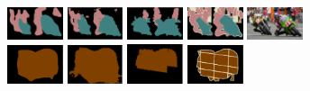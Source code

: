 \begin{figure}[h!]
\begin{subfigure}{0.55\textwidth}
		\\
		\includegraphics[width=0.18\textwidth]{image/result/compare/my_motor.png}
		\includegraphics[width=0.18\textwidth]{image/result/compare/fcn_motor.png}
		\includegraphics[width=0.18\textwidth]{image/result/compare/sds_motor.png}
		\includegraphics[width=0.18\textwidth]{image/result/compare/2007_005173.png}
		\includegraphics[width=0.18\textwidth]{image/result/compare/2007_005173.jpg}
		\\
		\includegraphics[width=0.18\textwidth]{image/result/compare/my_sheep.pdf}
		\includegraphics[width=0.18\textwidth]{image/result/compare/fcn_sheep.png}
		\includegraphics[width=0.18\textwidth]{image/result/compare/sds_sheep.png}
		\includegraphics[width=0.18\textwidth]{image/result/compare/gt_sheep.pdf}

\end{subfigure}
\end{figure}
